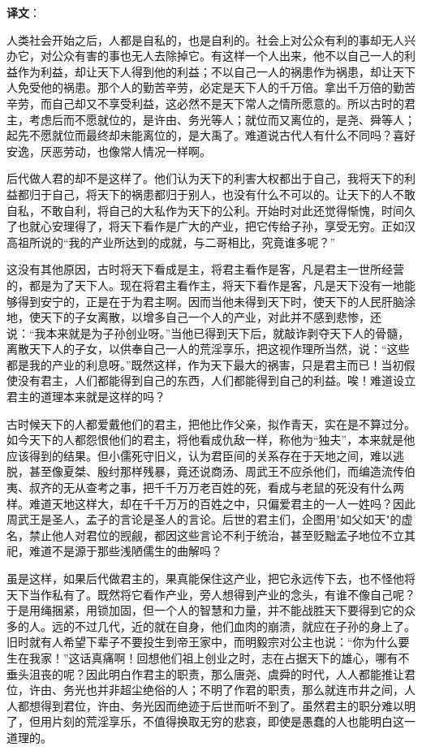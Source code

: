 \documentclass[12pt,UTF-8,openany]{ctexbook}
\begin{document}
\newpage

\textbf{译文}：

\vspace{1em}

\begin{normalsize}
    
    人类社会开始之后，人都是自私的，也是自利的。社会上对公众有利的事却无人兴办它，对公众有害的事也无人去除掉它。有这样一个人出来，他不以自己一人的利益作为利益，却让天下人得到他的利益；不以自己一人的祸患作为祸患，却让天下人免受他的祸患。那个人的勤苦辛劳，必定是天下人的千万倍。拿出千万倍的勤苦辛劳，而自己却又不享受利益，这必然不是天下常人之情所愿意的。所以古时的君主，考虑后而不愿就位的，是许由、务光等人；就位而又离位的，是尧、舜等人；起先不愿就位而最终却未能离位的，是大禹了。难道说古代人有什么不同吗？喜好安逸，厌恶劳动，也像常人情况一样啊。
    
    后代做人君的却不是这样了。他们认为天下的利害大权都出于自己，我将天下的利益都归于自己，将天下的祸患都归于别人，也没有什么不可以的。让天下的人不敢自私，不敢自利，将自己的大私作为天下的公利。开始时对此还觉得惭愧，时间久了也就心安理得了，将天下看作是广大的产业，把它传给子孙，享受无穷。正如汉高祖所说的“我的产业所达到的成就，与二哥相比，究竟谁多呢？”
    
    这没有其他原因，古时将天下看成是主，将君主看作是客，凡是君主一世所经营的，都是为了天下人。现在将君主看作主，将天下看作是客，凡是天下没有一地能够得到安宁的，正是在于为君主啊。因而当他未得到天下时，使天下的人民肝脑涂地，使天下的子女离散，以增多自己一个人的产业，对此并不感到悲惨，还说：“我本来就是为子孙创业呀。”当他已得到天下后，就敲诈剥夺天下人的骨髓，离散天下人的子女，以供奉自己一人的荒淫享乐，把这视作理所当然，说：“这些都是我的产业的利息呀。”既然这样，作为天下最大的祸害，只是君主而已！当初假使没有君主，人们都能得到自己的东西，人们都能得到自己的利益。唉！难道设立君主的道理本来就是这样的吗？
    
    古时候天下的人都爱戴他们的君主，把他比作父亲，拟作青天，实在是不算过分。如今天下的人都怨恨他们的君主，将他看成仇敌一样，称他为“独夫”，本来就是他应该得到的结果。但小儒死守旧义，认为君臣间的关系存在于天地之间，难以逃脱，甚至像夏桀、殷纣那样残暴，竟还说商汤、周武王不应杀他们，而编造流传伯夷、叔齐的无从查考之事，把千千万万老百姓的死，看成与老鼠的死没有什么两样。难道天地这样大，却在千千万万的百姓之中，只偏爱君主的一人一姓吗？因此周武王是圣人，孟子的言论是圣人的言论。后世的君主们，企图用"如父如天"的虚名，禁止他人对君位的觊觎，都因这些言论不利于统治，甚至贬黜孟子地位不立其祀，难道不是源于那些浅陋儒生的曲解吗？
    
    虽是这样，如果后代做君主的，果真能保住这产业，把它永远传下去，也不怪他将天下当作私有了。既然将它看作产业，旁人想得到产业的念头，有谁不像自己呢？于是用绳捆紧，用锁加固，但一个人的智慧和力量，并不能战胜天下要得到它的众多的人。远的不过几代，近的就在自身，他们血肉的崩溃，就应在子孙的身上了。旧时就有人希望下辈子不要投生到帝王家中，而明毅宗对公主也说：“你为什么要生在我家！”这话真痛啊！回想他们祖上创业之时，志在占据天下的雄心，哪有不垂头沮丧的呢？因此明白作君主的职责，那么唐尧、虞舜的时代，人人都能推让君位，许由、务光也并非超尘绝俗的人；不明了作君的职责，那么就连市井之间，人人都想得到君位，许由、务光因而绝迹于后世而听不到了。虽然君主的职分难以明了，但用片刻的荒淫享乐，不值得换取无穷的悲哀，即使是愚蠢的人也能明白这一道理的。
    

\end{normalsize}
\end{document}
